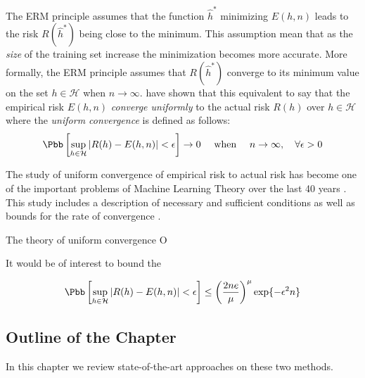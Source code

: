 The ERM principle assumes that the function $\hat{h}^*$ minimizing $E(h, n)$ leads to the risk $R(\hat{h}^*)$ being close to the minimum.
This assumption mean that as the \emph{size} of the training set increase the minimization becomes more accurate. More formally, the ERM principle assumes that $R(\hat{h}^*)$ converge to its minimum value on the set $h \in \mathcal{H}$ when $n \rightarrow \infty$.  
\citet{Vapnik1991TheNA} have shown that this equivalent to say that the empirical risk $E(h, n)$ \emph{converge uniformly} to the actual risk $R(h)$ over $h \in \mathcal{H}$ where the \emph{uniform convergence} is defined as follows:
\begin{equation}
  \Pbb \left[ \sup_{h \in \mathcal{H}} \left| R(h) - E(h, n) \right| < \epsilon \right] \rightarrow 0 \quad \text{ when } \quad n \rightarrow \infty, \quad \forall \epsilon > 0 
\end{equation}


The study of uniform convergence of empirical risk to actual risk has become one of the important problems of Machine Learning Theory over the last 40 years \cite{}.
This study includes a description of necessary and sufficient conditions as well as bounds for the rate of convergence \cite{vapnik1982estimation}. 




The theory of uniform convergence O


It would be of interest to bound the 



\begin{equation}
  \Pbb \left[ \sup_{h \in \mathcal{H}} \left| R(h) - E(h, n) \right| < \epsilon \right] \leq \left( \frac{2 n e}{\mu} \right)^\mu \exp\{ -\epsilon ^2 n\} 
\end{equation}







\subsection{Outline of the Chapter}
\label{subsection:ch2-outline_of_the_chapter}


In this chapter we review state-of-the-art approaches on these two methods. 







